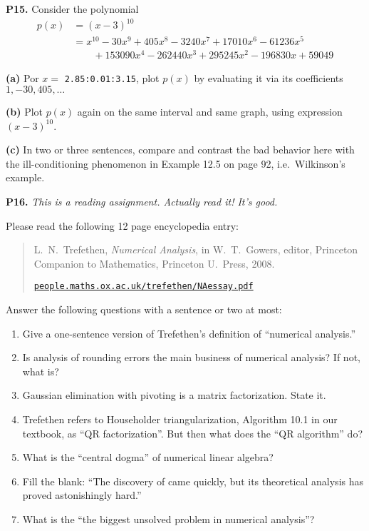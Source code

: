 \documentclass[12pt]{amsart}
\newcommand{\prob}[1]{\bigskip\noindent\textbf{#1.}\quad }
\newcommand{\epart}[1]{\medskip\noindent\textbf{(#1)}\quad }
\begin{document}
\prob{P15}  Consider the polynomial
\begin{align*}
p(x) &= (x-3)^{10} \\
     &= x^{10} - 30 x^9 + 405 x^8 - 3240 x^7 + 17010 x^6 - 61236 x^5 \\
     &\qquad   + 153090 x^4 - 262440 x^3 + 295245 x^2 - 196830 x + 59049
\end{align*}

\epart{a} Por $x=$ \small\verb|2.85:0.01:3.15|\normalsize, plot $p(x)$ by evaluating it via its coefficients $1,-30,405,\dots$

\epart{b} Plot $p(x)$ again on the same interval and same graph, using expression $(x-3)^{10}$.

\epart{c} In two or three sentences, compare and contrast the bad behavior here with the ill-conditioning phenomenon in Example 12.5 on page 92, i.e.~Wilkinson's example.


\prob{P16}  \emph{This is a reading assignment.  Actually read it!  It's good.}

\medskip
\noindent Please read the following 12 page encyclopedia entry:

\medskip
\begin{quote}
L.~N.~Trefethen, \emph{Numerical Analysis}, in W.~T.~Gowers, editor, Princeton Companion to Mathematics, Princeton U.~Press, 2008.

\href{https://people.maths.ox.ac.uk/trefethen/NAessay.pdf}{\texttt{people.maths.ox.ac.uk/trefethen/NAessay.pdf}}
\end{quote}

\medskip
\noindent Answer the following questions with a sentence or two at most:
\renewcommand{\labelenumi}{\emph{(\roman{enumi})}}
\begin{enumerate}
\item Give a one-sentence version of Trefethen's definition of ``numerical analysis.''
\item Is analysis of rounding errors the main business of numerical analysis?  If not, what is?
\item Gaussian elimination with pivoting is a matrix factorization.  State it.
\item Trefethen refers to Householder triangularization, Algorithm 10.1 in our textbook, as ``QR factorization''.  But then what does the ``QR algorithm'' do?
\item What is the ``central dogma'' of numerical linear algebra?
\item Fill the blank: ``The discovery of \underline{\phantom{LJpivotingAJ}} came quickly, but its theoretical analysis has proved astonishingly hard.'' %
\item What is the ``the biggest unsolved problem in numerical analysis''?
\end{enumerate}
\end{document}
